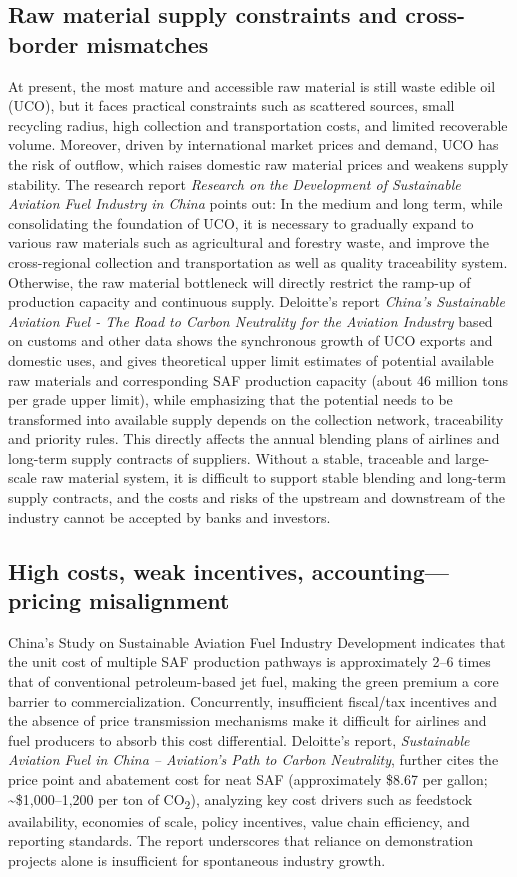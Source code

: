 \documentclass[a4paper,11pt]{article}
\begin{document}
\subsection{Raw material supply constraints and cross-border mismatches}
At present, the most mature and accessible raw material is still waste edible oil (UCO), but it faces practical constraints such as scattered sources, small recycling radius, high collection and transportation costs, and limited recoverable volume. Moreover, driven by international market prices and demand, UCO has the risk of outflow, which raises domestic raw material prices and weakens supply stability. The research report \textit{Research on the Development of Sustainable Aviation Fuel Industry in China} points out: In the medium and long term, while consolidating the foundation of UCO, it is necessary to gradually expand to various raw materials such as agricultural and forestry waste, and improve the cross-regional collection and transportation as well as quality traceability system. Otherwise, the raw material bottleneck will directly restrict the ramp-up of production capacity and continuous supply. Deloitte's report \textit{China's Sustainable Aviation Fuel - The Road to Carbon Neutrality for the Aviation Industry} based on customs and other data shows the synchronous growth of UCO exports and domestic uses, and gives theoretical upper limit estimates of potential available raw materials and corresponding SAF production capacity (about 46 million tons per grade upper limit), while emphasizing that the potential needs to be transformed into available supply depends on the collection network, traceability and priority rules. This directly affects the annual blending plans of airlines and long-term supply contracts of suppliers. Without a stable, traceable and large-scale raw material system, it is difficult to support stable blending and long-term supply contracts, and the costs and risks of the upstream and downstream of the industry cannot be accepted by banks and investors.

\subsection{High costs, weak incentives, accounting---pricing misalignment}
China's Study on Sustainable Aviation Fuel Industry Development indicates that the unit cost of multiple SAF production pathways is approximately 2--6 times that of conventional petroleum-based jet fuel, making the green premium a core barrier to commercialization. Concurrently, insufficient fiscal/tax incentives and the absence of price transmission mechanisms make it difficult for airlines and fuel producers to absorb this cost differential. Deloitte's report, \textit{Sustainable Aviation Fuel in China -- Aviation's Path to Carbon Neutrality}, further cites the price point and abatement cost for neat SAF (approximately \$8.67 per gallon; \textasciitilde\$1,000--1,200 per ton of CO\textsubscript{2}), analyzing key cost drivers such as feedstock availability, economies of scale, policy incentives, value chain efficiency, and reporting standards. The report underscores that reliance on demonstration projects alone is insufficient for spontaneous industry growth.
\end{document}

